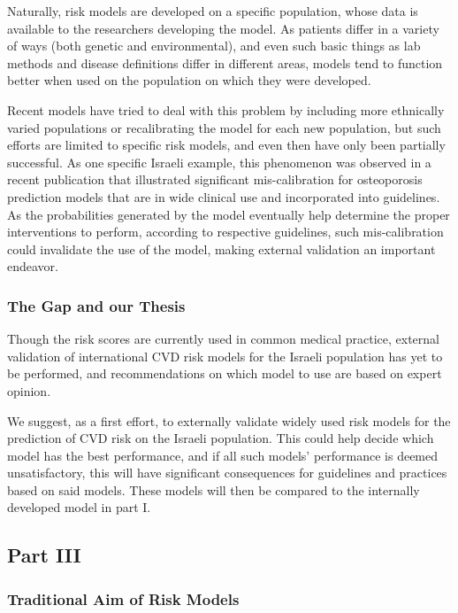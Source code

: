 \documentclass[a4paper,12pt]{article}
\begin{document}
		Naturally, risk models are developed on a specific population, whose data is available to the researchers developing the model. As patients differ in a variety of ways (both genetic and environmental), and even such basic things as lab methods and disease definitions differ in different areas, models tend to function better when used on the population on which they were developed\cite{DAgostino2001,Bastuji-Garin2002}.
		
		Recent models have tried to deal with this problem by including more ethnically varied populations\cite{DeFilippis2015} or recalibrating the model for each new population\cite{Kanis2008}, but such efforts are limited to specific risk models, and even then have only been partially successful\cite{Dagan2017}. As one specific Israeli example, this phenomenon was observed in a recent publication that illustrated significant mis-calibration for osteoporosis prediction models that are in wide clinical use and incorporated into guidelines\cite{Dagan2017}. As the probabilities generated by the model eventually help determine the proper interventions to perform, according to respective guidelines, such mis-calibration could invalidate the use of the model, making external validation an important endeavor\cite{Moons2012}.
		
		\subsubsection{The Gap and our Thesis}
		
		Though the risk scores are currently used in common medical practice, external validation of international CVD risk models for the Israeli population has yet to be performed, and recommendations on which model to use are based on expert opinion\cite{Bitzur2015}.
		
		We suggest, as a first effort, to externally validate widely used risk models for the prediction of CVD risk on the Israeli population. This could help decide which model has the best performance, and if all such models' performance is deemed unsatisfactory, this will have significant consequences for guidelines and practices based on said models. These models will then be compared to the internally developed model in part I.
		
		\subsection{Part III}
		
			\subsubsection{Traditional Aim of Risk Models}
			
\end{document}
